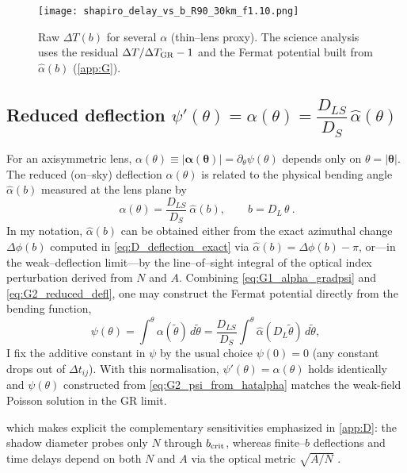 \documentclass{iopjournal}
\begin{document}
\begin{figure}[t]
\centering
\texttt{[image: shapiro\_delay\_vs\_b\_R90\_30km\_f1.10.png]}
\caption{Raw \(\Delta T(b)\) for several \(\alpha\) (thin--lens proxy). The science analysis uses the residual \(\Delta T/\Delta T_{\rm GR}-1\) and the Fermat potential built from \(\hat\alpha(b)\) (\cref{app:G}).}
\end{figure}


\subsection{\texorpdfstring{Reduced deflection $\psi'(\theta)=\alpha(\theta)=\dfrac{D_{LS}}{D_S}\,\hat\alpha(\theta)$}{Reduced deflection: psi'(θ) = alpha(θ) = (DLS/DS) alpha-hat(θ)}}\label{app:G2}

For an axisymmetric lens, $\alpha(\theta)\equiv|\boldsymbol\alpha(\boldsymbol\theta)|=\partial_\theta\psi(\theta)$ depends only on $\theta=|\boldsymbol\theta|$. The reduced (on–sky) deflection $\alpha(\theta)$ is related to the physical bending angle $\hat\alpha(b)$ measured at the lens plane by
\begin{equation}
\boxed{\ \alpha(\theta)=\frac{D_{LS}}{D_{S}}\ \hat\alpha(b),\qquad b=D_L\,\theta\ } .
\label{eq:G2_reduced_defl}
\end{equation}
In my notation, $\hat\alpha(b)$ can be obtained either from the exact azimuthal change $\Delta\phi(b)$ computed in \eqref{eq:D_deflection_exact} via $\hat\alpha(b)=\Delta\phi(b)-\pi$, or—in the weak–deflection limit—by the line–of–sight integral of the optical index perturbation derived from $N$ and $A$. Combining \eqref{eq:G1_alpha_gradpsi} and \eqref{eq:G2_reduced_defl}, one may construct the Fermat potential directly from the bending function,
\begin{equation}
\psi(\theta)=\int^{\theta}\!\alpha(\tilde\theta)\,d\tilde\theta
=\frac{D_{LS}}{D_S}\int^{\theta}\!\hat\alpha(D_L\tilde\theta)\,d\tilde\theta,
\label{eq:G2_psi_from_hatalpha}
\end{equation}
I fix the additive constant in $\psi$ by the usual choice $\psi(0)=0$ (any constant drops out of $\Delta t_{ij}$). With this normalisation, $\psi'(\theta)=\alpha(\theta)$ holds identically and $\psi(\theta)$ constructed from \eqref{eq:G2_psi_from_hatalpha} matches the weak-field Poisson solution in the GR limit.

which makes explicit the complementary sensitivities emphasized in \cref{app:D}: the shadow diameter probes only $N$ through $b_{\rm crit}$, whereas finite–$b$ deflections and time delays depend on both $N$ and $A$ via the optical metric $\sqrt{A/N}$ \cite{Perlick2004LRR,BlandfordNarayan1986}.
\end{document}
